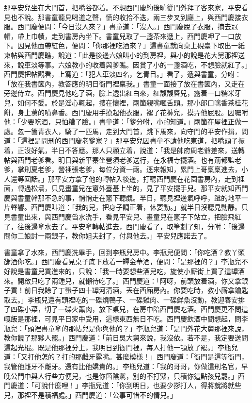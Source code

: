 那平安兒坐在大門首，把嘴谷都着。不想西門慶約後晌從門外拜了客來家，平安看見也不說。那書童聽見喝道之聲，慌的收拾不迭，兩三步叉到廳上，與西門慶接衣服。西門慶便問：「今日沒人來？」書童道：「沒人。」西門慶脫了衣服，摘去冠帽，帶上巾幘，走到書房內坐下。書童兒取了一盞茶來遞上，西門慶呷了一口放下。因見他面帶紅色，便問：「你那裡吃酒來？」這書童就向桌上硯臺下取出一紙柬帖與西門慶瞧，說道：「此是後邊六娘叫小的到房裡，與小的說是花大舅那裡送來，說車淡等事。六娘教小的收着與爹瞧。因賞了小的一盞酒吃，不想臉就紅了。」西門慶把帖觀看，上寫道：「犯人車淡四名，乞青目。」看了，遞與書童，分咐：「放在我書篋內，教答應的明日衙門裡稟我。」書童一面接了放在書篋內，又走在旁邊侍立。西門慶見他吃了酒，臉上透出紅白來，紅馥馥唇兒，露着一口糯米牙兒，如何不愛。於是淫心輒起，摟在懷裡，兩箇親嘴咂舌頭。那小郎口噙香茶桂花餅，身上薰的噴鼻香。西門慶用手撩起他衣服，褪了花褲兒，摸弄他屁股。因囑咐他：「少要吃酒，只怕糟了臉。」書童道：「爹分咐，小的知道。」兩箇在屋裡正做一處。忽一箇青衣人，騎了一匹馬，走到大門首，跳下馬來，向守門的平安作揖，問道：「這裡是問刑的西門慶老爹家？」那平安兒因書童不請他吃東道，把嘴頭子撅着，正沒好氣，半日不答應。那人只顧立着，說道：「我是帥府周老爺差來，送轉帖與西門老爹看。明日與新平寨坐營須老爹送行，在永福寺擺酒。也有荊都監老爹，掌刑夏老爹，營裡張老爹，每位分資一兩。逕來報知，累門上哥稟稟進去，小人還等回話。」那平安方拿了他的轉帖入後邊，打聽西門慶在花園書房內，走到裡面，轉過松墻，只見畫童兒在窻外臺基上坐的，見了平安擺手兒。那平安就知西門慶與書童幹那不急的事，悄悄走在窻下聽覷。半日，聽見裡邊氣呼呼，跐的地平一片聲響。西門慶叫道：「我的兒，把身子調正着，休要動。」就半日沒聽見動靜。{}只見書童出來，與西門慶舀水洗手，看見平安兒、畫童兒在窻子下站立，把臉飛紅了，往後邊拿水去了。平安拿轉帖進去，西門慶看了，取筆劃了知，分咐：「後邊問你二娘討一兩銀子，教你姐夫封了，付與他去。」平安兒應諾去了。

書童拿了水來，西門慶洗畢手，回到李瓶兒房中。李瓶兒便問：「你吃酒？教丫頭篩酒你吃。」西門慶看見桌子底下放着一罈金華酒，便問：「是那裡的？」李瓶兒不好說是書童兒買進來的，只說：「我一時要想些酒兒吃，旋使小厮街上買了這罈酒來。開啟只吃了兩鍾兒，就懶待吃了。」西門慶道：「阿呀，前頭放着酒，你又拿銀子買！前日我賒了丁蠻子四十罈河清酒，丟在西廂房內。你要吃時，教小厮拿鑰匙取去。」李瓶兒還有頭裡吃的一碟燒鴨子、一碟雞肉、一碟鮮魚沒動，教迎春安排了四碟小菜，切了一碟火薰肉，放下桌兒，在房中陪西門慶吃酒。西門慶更不問這嘎飯是那裡，可見平日家中受用，這樣東西無日不吃。西門慶飲酒中間想起，問李瓶兒：「頭裡書童拿的那帖兒是你與他的？」李瓶兒道：「是門外花大舅那裡來說，教你饒了那夥人罷。」西門慶道：「前日吳大舅來說，我沒依。若不是，我定要送問這起光棍。既是他那裡分上，我明日到衙門裡，每人打他一頓放了罷。」李瓶兒道：「又打他怎的？打的那雌牙露嘴。甚麼模樣！」西門慶道：「衙門是這等衙門，我管他雌牙不雌牙。還有比他嬌貴的。」李瓶兒道：「我的哥哥，你做這刑名官，早晚公門中與人行些方便兒，也是你箇陰騭，別的不打緊，只積你這點孩兒罷。」西門慶道：「可說什麼哩！」李瓶兒道：「你到明日，也要少拶打人，得將就將就些兒，那裡不是積福處。」西門慶道：「公事可惜不的情兒。」

